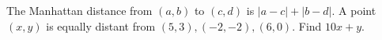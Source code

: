 The Manhattan distance from $(a,b)$ to $(c,d)$ is $|a-c|+|b-d|$. A point $(x,y)$ is equally distant from $(5,3),(-2,-2),(6,0)$. Find $10x+y$.
